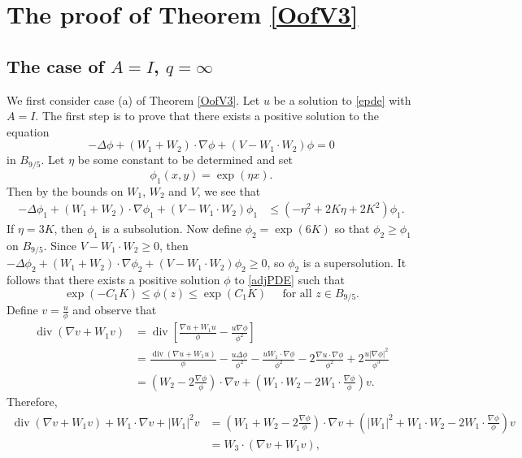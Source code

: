 \documentclass[12pt,reqno]{amsart}
\theoremstyle{plain}
\theoremstyle{definition}
\newcommand{\disp}{\displaystyle}
\DeclareMathOperator{\di}{div}
\newcommand{\iny}{\infty}
\newcommand{\LP}{\Delta}
\newcommand{\gr}{\nabla}
\newcommand{\abs}[1]{\left\vert#1\right\vert}
\newcommand{\brac}[1]{\left[#1\right]}
\newcommand{\pr}[1]{\left( #1 \right) }
\begin{document}
\section{The proof of Theorem \ref{OofV3}}
\label{S8}

\subsection{The case of $A= I$, $q = \iny$}

We first consider case (a) of Theorem \ref{OofV3}.
Let $u$ be a solution to \eqref{epde} with $A = I$.
The first step is to prove that there exists a positive solution to the equation
\begin{equation}
-\LP \phi + \pr{W_1 + W_2} \cdot \gr \phi + \pr{V - W_1 \cdot W_2} \phi = 0
\label{adjPDE}
\end{equation}
in $B_{9/5}$.
Let $\eta$ be some constant to be determined and set 
$$\phi_1\pr{x,y} = \exp\pr{\eta x}.$$ 
Then by the bounds on $W_1$, $W_2$ and $V$, we see that
\begin{align*}
-\LP \phi_1 + \pr{W_1 + W_2} \cdot \gr \phi_1 +  \pr{V - W_1 \cdot W_2}  \phi_1
&\le\pr{ -\eta^2 + 2K \eta + 2 K^2} \phi_1 .
\end{align*}
If $\eta = 3 K$, then $\phi_1$ is a subsolution.  
Now define $\phi_2 = \exp\pr{6 K}$ so that $\phi_2 \ge \phi_1$ on $B_{9/5}$.
Since $V - W_1 \cdot W_2 \ge 0$, then $-\LP \phi_2 + \pr{W_1 + W_2} \cdot \gr \phi_2 +  \pr{V - W_1 \cdot W_2}  \phi_2 \ge 0$, so $\phi_2$ is a supersolution.  
It follows that there exists a positive solution $\phi$ to \eqref{adjPDE} such that
\begin{equation}
\exp\pr{-C_1 K} \le \phi\pr{z} \le \exp\pr{C_1K} \;\;\;\ \text{ for all } z \in B_{9/5}.
\label{phiBd1}
\end{equation}
Define $\disp v = \frac{u}{\phi}$ and observe that
\begin{align*}
\di \pr{\gr v + W_1 v} 
&= \di \brac{\frac{\gr u + W_1 u}{\phi} - \frac{u \gr \phi}{\phi^2}} \\
&=  \frac{\di \pr{\gr u + W_1 u}}{\phi} - \frac{u \LP \phi}{\phi^2} - \frac{ u W_1 \cdot \gr \phi }{\phi^2} - 2\frac{\gr u \cdot \gr \phi}{\phi^2}  + 2 \frac{u \abs{\gr \phi}^2}{\phi^3} \\
&=  \pr{W_2 - 2 \frac{\gr \phi}{\phi}} \cdot \gr v 
+ \pr{W_1 \cdot W_2 - 2 W_1 \cdot \frac{ \gr \phi }{\phi} } v.
\end{align*}
Therefore,
\begin{align*}
\di \pr{\gr v + W_1 v} + W_1 \cdot \gr v + \abs{W_1}^2 v 
&=  \pr{W_1 + W_2 - 2 \frac{\gr \phi}{\phi}} \cdot \gr v 
+ \pr{\abs{W_1}^2 + W_1 \cdot W_2- 2W_1 \cdot \frac{ \gr \phi }{\phi} } v \\
&= W_3 \cdot \pr{\gr v + W_1 v},
\end{align*}
\end{document}
